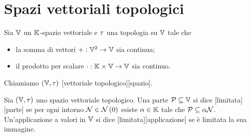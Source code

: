 \section{Spazi vettoriali topologici}
\label{Topologia_SpaziVettorialiTopologici}
\begin{Definition}
	Sia $\mathbb{V}$ un $\mathbb{K}$-spazio vettoriale e $\tau$ una topologia su $\mathbb{V}$ tale che
	\begin{itemize}
		\item la somma di vettori $+: \mathbb{V}^2 \rightarrow \mathbb{V}$ sia continua;
		\item il prodotto per scalare $\cdot: \mathbb{K} \times \mathbb{V} \rightarrow \mathbb{V}$ sia continuo.
	\end{itemize}
	Chiamiamo $(\mathbb{V},\tau)$ [vettoriale topologico][spazio].
\end{Definition}
\begin{Definition}
	Sia $(\mathbb{V},\tau)$ uno spazio vettoriale topologico.
	Una parte $\mathcal{P} \subseteq \mathbb{V}$ si dice [limitata][parte] se per ogni intorno $\Neighborhood \in \Neighborhoods{0}$ esiste $\alpha \in \mathbb{K}$ tale che $\mathcal{P} \subseteq \alpha \mathcal{N}$. Un'applicazione a valori in $\mathbb{V}$ si dice [limitata][applicazione] se \`e limitata la sua immagine.
\end{Definition}
